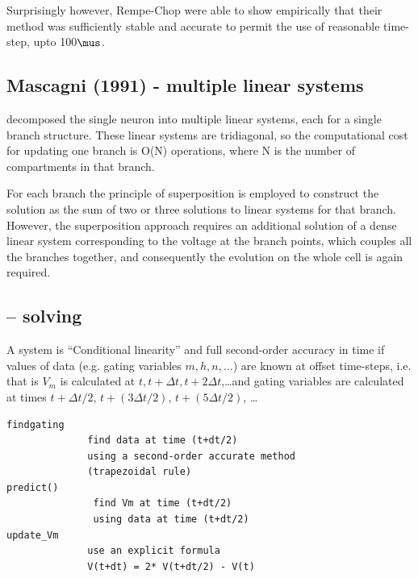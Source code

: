 Surprisingly however, Rempe-Chop were able to show empirically that their method
was sufficiently stable and accurate to permit the use of reasonable time-step,
upto 100$\mus$.

\subsection{Mascagni (1991) - multiple linear systems}
\label{sec:Mascagni-1991}

\citep{mascagni1991} decomposed the single neuron into multiple linear systems,
each for a single branch structure. 
These linear systems are tridiagonal, so the computational cost for updating one
branch is O(N) operations, where N is the number of compartments in that branch.

For each branch the principle of superposition is employed to construct the
solution as the sum of two or three solutions to linear systems for that branch.
However, the superposition approach requires an additional solution of a dense
linear system corresponding to the voltage at the branch points, which couples
all the branches together, and consequently the evolution on the whole cell is
again required.

\subsection{-- solving}

A system is ``Conditional linearity'' and full second-order accuracy in time
if values of data (e.g. gating variables $m,h, n, \ldots$) are known at offset
time-steps, i.e. that is $V_m$ is calculated at $t, t+\Delta t, t + 2\Delta
t$,\ldots and gating variables are calculated at times $t+\Delta t/2$, 
$t+(3\Delta t/2)$, 
 $t + (5\Delta t/2)$, \ldots
 
\begin{verbatim}
findgating
              find data at time (t+dt/2)
              using a second-order accurate method
              (trapezoidal rule)
predict()      
               find Vm at time (t+dt/2)
               using data at time (t+dt/2)
update_Vm      
              use an explicit formula
              V(t+dt) = 2* V(t+dt/2) - V(t)
                             
\end{verbatim}


